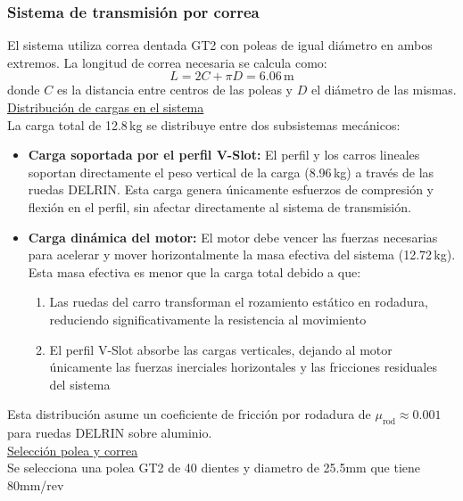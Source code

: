 \subsubsection{Sistema de transmisión por correa}
El sistema utiliza correa dentada GT2 con poleas de igual diámetro en ambos extremos. La longitud de correa necesaria se calcula como:
\begin{equation}
L = 2C + \pi D = 6.06\,\text{m}
\label{eq:longitud_correa}
\end{equation}
donde $C$ es la distancia entre centros de las poleas y $D$ el diámetro de las mismas. \\

\underline{Distribución de cargas en el sistema} \\
La carga total de 12.8\,kg se distribuye entre dos subsistemas mecánicos:

\begin{itemize}[label=$\bullet$]
    \item \textbf{Carga soportada por el perfil V-Slot:} El perfil y los carros lineales soportan directamente el peso vertical de la carga (8.96\,kg) a través de las ruedas DELRIN. Esta carga genera únicamente esfuerzos de compresión y flexión en el perfil, sin afectar directamente al sistema de transmisión.
    
    \item \textbf{Carga dinámica del motor:} El motor debe vencer las fuerzas necesarias para acelerar y mover horizontalmente la masa efectiva del sistema (12.72\,kg). Esta masa efectiva es menor que la carga total debido a que:
    \begin{enumerate}
        \item Las ruedas del carro transforman el rozamiento estático en rodadura, reduciendo significativamente la resistencia al movimiento
        \item El perfil V-Slot absorbe las cargas verticales, dejando al motor únicamente las fuerzas inerciales horizontales y las fricciones residuales del sistema
    \end{enumerate}
\end{itemize}

Esta distribución asume un coeficiente de fricción por rodadura de $\mu_{\text{rod}} \approx 0.001$ para ruedas DELRIN sobre aluminio.\\
\underline{Selección polea y correa} \\

Se selecciona una polea GT2 de 40 dientes y diametro de 25.5mm que tiene 80mm/rev

